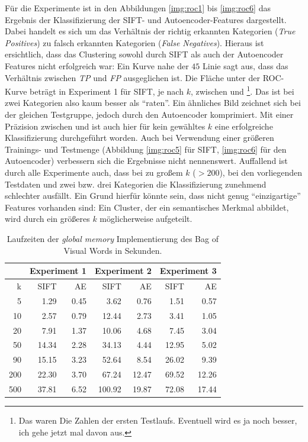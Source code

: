 Für die Experimente ist in den Abbildungen \ref{img:roc1} bis \ref{img:roc6} das Ergebnis der Klassifizierung der SIFT- und Autoencoder-Features dargestellt. Dabei handelt es sich um das Verhältnis der richtig erkannten Kategorien (\textit{True Positives}) zu falsch erkannten Kategorien (\textit{False Negatives}). Hieraus ist ersichtlich, dass das Clustering sowohl durch SIFT als auch der Autoencoder Features nicht erfolgreich war: Ein Kurve nahe der $45${\degree} Linie sagt aus, dass das Verhältnis zwischen \textit{TP} und \textit{FP} ausgeglichen ist. Die Fläche unter der ROC-Kurve beträgt in Experiment 1 für SIFT, je nach $k$, zwischen  und \footnote{Das waren Die Zahlen der ersten Testlaufs. Eventuell wird es ja noch besser, ich gehe jetzt mal davon aus.}. Das ist bei zwei Kategorien also kaum besser als \enquote{raten}. Ein ähnliches Bild zeichnet sich bei der gleichen Testgruppe, jedoch durch den Autoencoder komprimiert. Mit einer Präzision zwischen  und  ist auch hier für kein gewähltes $k$ eine erfolgreiche Klassifizierung durchgeführt worden.\newline
Auch bei Verwendung einer größeren Trainings- und Testmenge (Abbildung \ref{img:roc5} für SIFT, \ref{img:roc6} für den Autoencoder) verbessern sich die Ergebnisse nicht nennenswert. 
Auffallend ist durch alle Experimente auch, dass bei zu großem $k$ ($> 200$), bei den vorliegenden Testdaten und zwei bzw. drei Kategorien die Klassifizierung zunehmend schlechter ausfällt. Ein Grund hierfür könnte sein, dass nicht genug \enquote{einzigartige} Features vorhanden sind: Ein Cluster, der ein semantisches Merkmal abbildet, wird durch ein größeres $k$ möglicherweise aufgeteilt.

\begin{table}
    \centering
    \begin{tabular}[t]{|r|r|r|r|r|r|r|}
    \hline
	       & \multicolumn{2}{|c|}{Experiment 1} & \multicolumn{2}{|c|}{Experiment 2} & \multicolumn{2}{|c|}{Experiment 3} \\ \hline
	k    & SIFT  & AE   & SIFT   & AE    & SIFT  & AE    \\ \hline    
    5    &  1.29 & 0.45 &  3.62  &  0.76 &  1.51 &  0.57 \\ \hline
    10   &  2.57 & 0.79 &  12.44 &  2.73 &  3.41 &  1.05 \\ \hline
    20   &  7.91 & 1.37 &  10.06 &  4.68 &  7.45 &  3.04 \\ \hline
    50   & 14.34 & 2.28 &  34.13 &  4.44 & 12.95 &  5.02 \\ \hline
    90   & 15.15 & 3.23 &  52.64 &  8.54 & 26.02 &  9.39 \\ \hline
	200  & 22.30 & 3.70 &  67.24 & 12.47 & 69.52 & 12.26 \\ \hline
	500  & 37.81 & 6.52 & 100.92 & 19.87 & 72.08 & 17.44 \\ \hline
	\end{tabular}
	\caption{Laufzeiten der \textit{global memory} Implementierung des Bag of Visual Words in Sekunden.}
\end{table}

